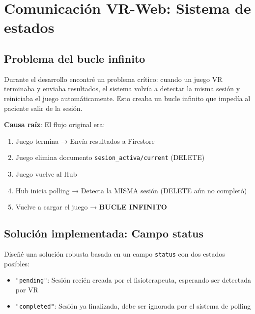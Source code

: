 \section{Comunicación VR-Web: Sistema de estados}

\subsection{Problema del bucle infinito}

Durante el desarrollo encontré un problema crítico: cuando un juego VR terminaba y enviaba resultados, el sistema volvía a detectar la misma sesión y reiniciaba el juego automáticamente. Esto creaba un bucle infinito que impedía al paciente salir de la sesión.

\textbf{Causa raíz}: El flujo original era:
\begin{enumerate}
    \item Juego termina → Envía resultados a Firestore
    \item Juego elimina documento \texttt{sesion\_activa/current} (DELETE)
    \item Juego vuelve al Hub
    \item Hub inicia polling → Detecta la MISMA sesión (DELETE aún no completó)
    \item Vuelve a cargar el juego → \textbf{BUCLE INFINITO}
\end{enumerate}

\subsection{Solución implementada: Campo status}

Diseñé una solución robusta basada en un campo \texttt{status} con dos estados posibles:

\begin{itemize}
    \item \texttt{"pending"}: Sesión recién creada por el fisioterapeuta, esperando ser detectada por VR
    \item \texttt{"completed"}: Sesión ya finalizada, debe ser ignorada por el sistema de polling
\end{itemize}

